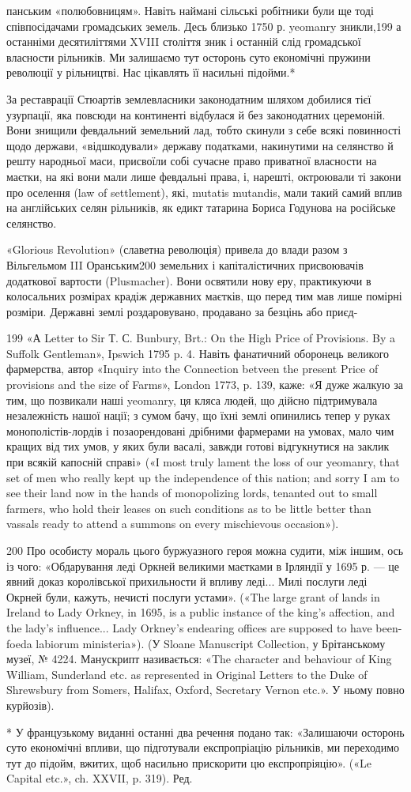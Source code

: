 панським «полюбовницям». Навіть наймані сільські робітники
були ще тоді співпосідачами громадських земель. Десь близько
1750 р. yeomanry зникли,199 а останніми десятиліттями XVIII
століття зник і останній слід громадської власности рільників.
Ми залишаємо тут осторонь суто економічні пружини революції
у рільництві. Нас цікавлять її насильні підойми.*

За реставрації Стюартів землевласники законодатним шляхом
добилися тієї узурпації, яка повсюди на континенті відбулася й
без законодатних церемоній. Вони знищили февдальний земельний
лад, тобто скинули з себе всякі повинності щодо держави,
«відшкодували» державу податками, накинутими на селянство
й решту народньої маси, присвоїли собі сучасне право приватної
власности на маєтки, на які вони мали лише февдальні права,
і, нарешті, октроювали ті закони про оселення (law of settlement),
які, mutatis mutandis, мали такий самий вплив на англійських
селян рільників, як едикт татарина Бориса Годунова на російське
селянство.

«Glorious Revolution» (славетна революція) привела до влади
разом з Вільгельмом III Оранським200 земельних і капіталістичних
присвоювачів додаткової вартости (Plusmacher). Вони освятили
нову еру, практикуючи в колосальних розмірах крадіж
державних маєтків, що перед тим мав лише помірні розміри.
Державні землі роздаровувано, продавано за безцінь або приєд-

199 «А Letter to Sir Т. С. Bunbury, Brt.: On the High Price of Provisions.
By a Suffolk Gentleman», Ipswich 1795 p. 4. Навіть фанатичний
оборонець великого фармерства, автор «Inquiry into the Connection
betveen the present Price of provisions and the size of Farms», London
1773, p. 139, каже: «Я дуже жалкую за тим, що позвикали наші yeomanry,
ця кляса людей, що дійсно підтримувала незалежність нашої нації;
з сумом бачу, що їхні землі опинились тепер у руках монополістів-лордів
і позаорендовані дрібними фармерами на умовах, мало чим кращих від
тих умов, у яких були васалі, завжди готові відгукнутися на заклик при
всякій капосній справі» («І most truly lament the loss of our yeomanry, that
set of men who really kept up the independence of this nation; and sorry I am
to see their land now in the hands of monopolizing lords, tenanted out to
small farmers, who hold their leases on such conditions as to be little better
than vassals ready to attend a summons on every mischievous occasion»).

200    Про особисту мораль цього буржуазного героя можна судити,
між іншим, ось із чого: «Обдарування леді Оркней великими маєтками
в Ірляндії у 1695 р. — це явний доказ королівської прихильности й впливу
леді... Милі послуги леді Окрней були, кажуть, нечисті послуги устами».
(«The large grant of lands in Ireland to Lady Orkney, in 1695, is a public
instance of the king’s affection, and the lady’s influence... Lady Orkney’s
endearing offices are supposed to have been-foeda labiorum ministeria»).
(У Sloane Manuscript Collection, у Брітанському музеї, № 4224.
Манускрипт називається: «The character and behaviour of King William,
Sunderland etc. as represented in Original Letters to the Duke of
Shrewsbury from Somers, Halifax, Oxford, Secretary Vernon etc.». У ньому
повно курйозів).

* У французькому виданні останні два речення подано так:
«Залишаючи осторонь суто економічні впливи, що підготували експропріацію
рільників, ми переходимо тут до підойм, вжитих, щоб насильно
прискорити цю експропріяцію». («Le Capital etc.», ch. XXVII,
p. 319). Ред.
